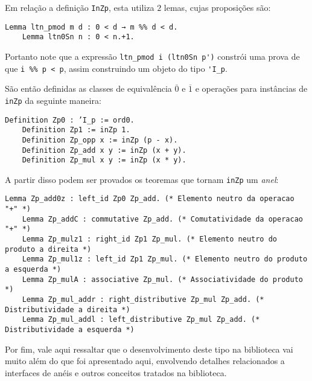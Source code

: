     Em relação a definição \lstinline[language = coq]{InZp}, esta utiliza $2$ lemas, cujas proposições são:
\begin{lstlisting}[language = coq]
    Lemma ltn_pmod m d : 0 < d → m %% d < d.
    Lemma ltn0Sn n : 0 < n.+1.
\end{lstlisting}
Portanto note que a expressão \lstinline[language = coq]{ltn_pmod i (ltn0Sn p')} constrói uma prova de que \lstinline[language = coq]{i %% p < p}, assim construindo um objeto do tipo \lstinline[language = coq]{'I_p}. 

São então definidas as classes de equivalência $\overline{0}$ e $\overline{1}$ e operações para instâncias de \lstinline[language = coq]{inZp} da seguinte maneira:
\begin{lstlisting}[language = coq]
    Definition Zp0 : ’I_p := ord0.
    Definition Zp1 := inZp 1.
    Definition Zp_opp x := inZp (p - x).
    Definition Zp_add x y := inZp (x + y).
    Definition Zp_mul x y := inZp (x * y).
\end{lstlisting}
A partir disso podem ser provados os teoremas que tornam \lstinline[language = coq]{inZp} um \textit{anel}:
\begin{lstlisting}[language = coq]
    Lemma Zp_add0z : left_id Zp0 Zp_add. (* Elemento neutro da operacao "+" *)
    Lemma Zp_addC : commutative Zp_add. (* Comutatividade da operacao "+" *)
    Lemma Zp_mulz1 : right_id Zp1 Zp_mul. (* Elemento neutro do produto a direita *)
    Lemma Zp_mul1z : left_id Zp1 Zp_mul. (* Elemento neutro do produto a esquerda *)
    Lemma Zp_mulA : associative Zp_mul. (* Associatividade do produto *)
    Lemma Zp_mul_addr : right_distributive Zp_mul Zp_add. (* Distributividade a direita *)
    Lemma Zp_mul_addl : left_distributive Zp_mul Zp_add. (* Distributividade a esquerda *)
\end{lstlisting}
    Por fim, vale aqui ressaltar que o desenvolvimento deste tipo na biblioteca vai muito além do que foi apresentado aqui, envolvendo detalhes relacionados a interfaces de anéis e outros conceitos tratados na biblioteca.
